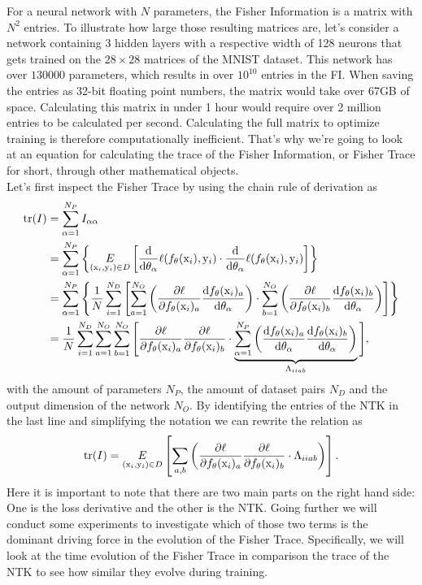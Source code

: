 For a neural network with $N$ parameters, the Fisher Information is a matrix with $N^2$ entries. To illustrate how large those resulting matrices are, let's consider a network containing 3 hidden layers with a respective width of 128 neurons that gets trained on the $28\times28$ matrices of the MNIST dataset. This network has over $130000$ parameters, which results in over $10^{10}$ entries in the FI. When saving the entries as 32-bit floating point numbers, the matrix would take over 67GB of space. Calculating  this matrix in under 1 hour would require over 2 million entries to be calculated per second. Calculating the full matrix to optimize training is therefore computationally inefficient. That's why we're going to look at an equation for calculating the trace of the Fisher Information, or Fisher Trace for short, through other mathematical objects.\\
Let's first inspect the Fisher Trace by using the chain rule of derivation as
\begin{equation}
	\begin{split}
		\mathrm{tr}(I) &= \sum_{\alpha = 1}^{N_P} I_{\alpha\alpha}\\
		&= \sum_{\alpha = 1}^{N_P} \left\{\underset{(\mathrm{x}_i, \mathrm{y}_i) \in D}{E} \left[\frac{\mathrm{d}}{\mathrm{d}\theta_\alpha}\ell(f_\theta(\mathrm{x}_i),\mathrm{y}_i)\cdot \frac{\mathrm{d}}{\mathrm{d}\theta_\alpha}\ell(f_\theta(\mathrm{x}_i),\mathrm{y}_i)\right]\right\}\\
		&= \sum_{\alpha = 1}^{N_P} \left\{ \frac{1}{N} \sum_{i = 1}^{N_D} \left[\sum_{a=1}^{N_O}\left(\frac{\partial\ell}{\partial f_\theta(\mathrm{x}_i)_a}\frac{\mathrm{d}f_\theta(\mathrm{x}_i)_a}{\mathrm{d}\theta_\alpha}\right)\cdot\sum_{b=1}^{N_O}\left(\frac{\partial\ell}{\partial f_\theta(\mathrm{x}_i)_b}\frac{\mathrm{d}f_\theta(\mathrm{x}_i)_b}{\mathrm{d}\theta_\alpha}\right)\right]\right\}\\
		&= \frac{1}{N} \sum_{i = 1}^{N_D} \sum_{a=1}^{N_O} \sum_{b=1}^{N_O} \Bigg[\frac{\partial\ell}{\partial f_\theta(\mathrm{x}_i)_a}\frac{\partial\ell}{\partial f_\theta(\mathrm{x}_i)_b} \cdot\underbrace{ \sum_{\alpha = 1}^{N_P} \left(\frac{\mathrm{d}f_\theta(\mathrm{x}_i)_a}{\mathrm{d}\theta_\alpha}\frac{\mathrm{d}f_\theta(\mathrm{x}_i)_b}{\mathrm{d}\theta_\alpha}\right)}_{\Lambda_{iiab}}\Bigg],
	\end{split} 
\end{equation}
with the amount of parameters $N_P$, the amount of dataset pairs $N_D$ and the output dimension of the network $N_O$. By identifying the entries of the NTK in the last line and simplifying the notation we can rewrite the relation as
\begin{equation}\label{eq:FisherNTKRelation}
	\mathrm{tr}(I) = \underset{(\mathrm{x}_i, \mathrm{y}_i) \in D}{E} \left[\sum_{a,b} \left(\frac{\partial\ell}{\partial f_\theta(\mathrm{x}_i)_a}\frac{\partial\ell}{\partial f_\theta(\mathrm{x}_i)_b} \cdot \Lambda_{iiab}\right)\right].
\end{equation}
Here it is important to note that there are two main parts on the right hand side: One is the loss derivative and the other is the NTK. Going further we will conduct some experiments to investigate which of those two terms is the dominant driving force in the evolution of the Fisher Trace. Specifically, we will look at the time evolution of the Fisher Trace in comparison the trace of the NTK to see how similar they evolve during training.